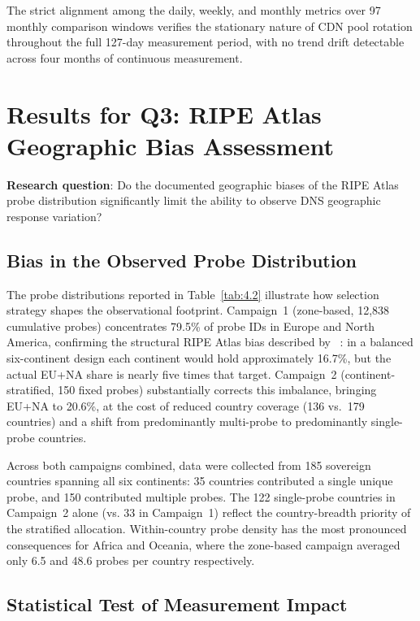 The strict alignment among the daily, weekly, and monthly metrics over 97 monthly comparison windows verifies the stationary nature of \ac{CDN} pool rotation throughout the full 127-day measurement period, with no trend drift detectable across four months of continuous measurement.

\bigskip
\section{Results for Q3: RIPE Atlas Geographic Bias Assessment}
\label{sec:4.4}

\textbf{Research question}: Do the documented geographic biases of the RIPE Atlas probe distribution significantly limit the ability to observe \ac{DNS} geographic response variation?

\subsection{Bias in the Observed Probe Distribution}
\label{subsec:4.4.1}

The probe distributions reported in Table~\ref{tab:4.2} illustrate how selection strategy shapes the observational footprint. Campaign~1 (zone-based, 12,838 cumulative probes) concentrates 79.5\% of probe IDs in Europe and North America, confirming the structural RIPE Atlas bias described by \citeauthor{Bajpai2017}~\cite{Bajpai2017}: in a balanced six-continent design each continent would hold approximately 16.7\%, but the actual EU+NA share is nearly five times that target. Campaign~2 (continent-stratified, 150 fixed probes) substantially corrects this imbalance, bringing EU+NA to 20.6\%, at the cost of reduced country coverage (136 vs.\ 179 countries) and a shift from predominantly multi-probe to predominantly single-probe countries.

Across both campaigns combined, data were collected from 185 sovereign countries spanning all six continents: 35 countries contributed a single unique probe, and 150 contributed multiple probes. The 122 single-probe countries in Campaign~2 alone (vs. 33 in Campaign~1) reflect the country-breadth priority of the stratified allocation. Within-country probe density has the most pronounced consequences for Africa and Oceania, where the zone-based campaign averaged only 6.5 and 48.6 probes per country respectively.

\subsection{Statistical Test of Measurement Impact}
\label{subsec:4.4.2}

